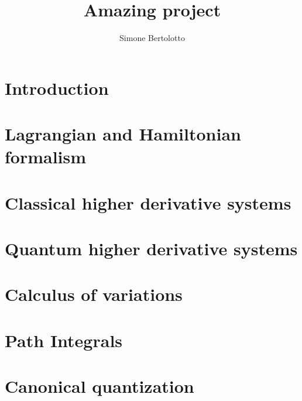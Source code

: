 \documentclass[a4paper]{article}
\title{Amazing project}
\author{Simone Bertolotto}
\theoremstyle{definition}
\numberwithin{equation}{section}
\begin{document}
  \maketitle

  \begin{abstract}
    \lipsum[1]
  \end{abstract}

  \newpage

  \section{Introduction}
  \label{section: introduction}
  

  \section{Lagrangian and Hamiltonian formalism}
  \label{section: lagrangin and hamiltonian formalism}
  

  \section{Classical higher derivative systems}
  \label{section: classical higher derivative systems}
  

  \section{Quantum higher derivative systems}
  \label{section: quantum higher derivative systems}
  

  \newpage
  \begin{appendices}
    \section{Calculus of variations}
    \label{appendix: calculus of variation}
    

    \section{Path Integrals}
    \label{appendix:path_integrals}
    

    \section{Canonical quantization}
    \label{appendix:canonical_quantization}
    
  \end{appendices}

  \newpage

  \printbibliography
\end{document}
